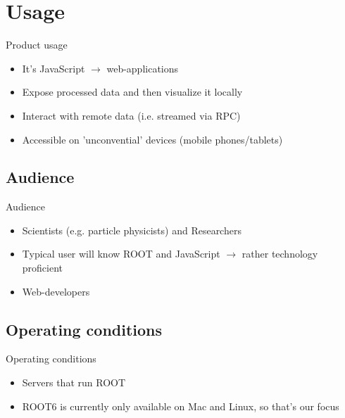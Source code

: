 \section{Usage}
\begin{frame}{Product usage}
        \begin{itemize}
		\item It's JavaScript $\rightarrow$ web-applications
		\item Expose processed data and then visualize it locally
		\item Interact with remote data (i.e. streamed via RPC)
		\item Accessible on 'unconvential' devices (mobile phones/tablets)
        \end{itemize}
\end{frame}


\subsection{Audience}
\begin{frame}{Audience}
        \begin{itemize}
		\item Scientists (e.g. particle physicists) and Researchers
		\item Typical user will know ROOT and JavaScript $\rightarrow$ rather technology proficient
		\item Web-developers
        \end{itemize}
\end{frame}

\subsection{Operating conditions}
\begin{frame}{Operating conditions}
        \begin{itemize}
                \item Servers that run ROOT
                \item ROOT6 is currently only available on Mac and Linux, so that's our focus
        \end{itemize}
\end{frame}
